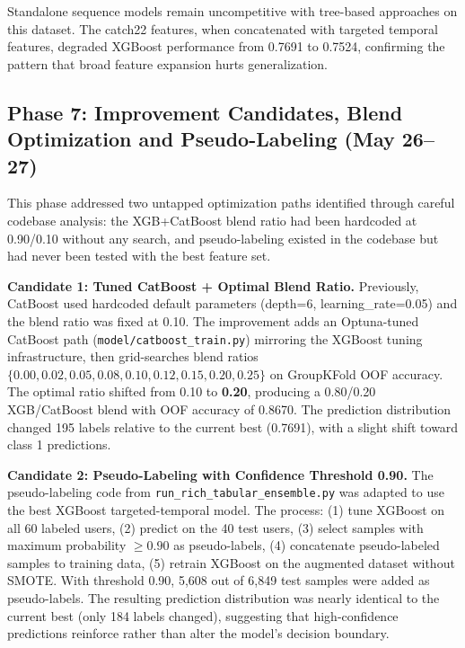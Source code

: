 \documentclass[12pt, a4paper]{article}
\begin{document}
Standalone sequence models remain uncompetitive with tree-based approaches on this dataset. The catch22 features, when concatenated with targeted temporal features, degraded XGBoost performance from 0.7691 to 0.7524, confirming the pattern that broad feature expansion hurts generalization.

\subsection{Phase 7: Improvement Candidates, Blend Optimization and Pseudo-Labeling (May 26--27)}

This phase addressed two untapped optimization paths identified through careful codebase analysis: the XGB+CatBoost blend ratio had been hardcoded at 0.90/0.10 without any search, and pseudo-labeling existed in the codebase but had never been tested with the best feature set.

\textbf{Candidate 1: Tuned CatBoost + Optimal Blend Ratio.} Previously, CatBoost used hardcoded default parameters (depth=6, learning\_rate=0.05) and the blend ratio was fixed at 0.10. The improvement adds an Optuna-tuned CatBoost path (\texttt{model/catboost\_train.py}) mirroring the XGBoost tuning infrastructure, then grid-searches blend ratios $\{0.00, 0.02, 0.05, 0.08, 0.10, 0.12, 0.15, 0.20, 0.25\}$ on GroupKFold OOF accuracy. The optimal ratio shifted from 0.10 to \textbf{0.20}, producing a 0.80/0.20 XGB/CatBoost blend with OOF accuracy of 0.8670. The prediction distribution changed 195 labels relative to the current best (0.7691), with a slight shift toward class 1 predictions.

\textbf{Candidate 2: Pseudo-Labeling with Confidence Threshold 0.90.} The pseudo-labeling code from \texttt{run\_rich\_tabular\_ensemble.py} was adapted to use the best XGBoost targeted-temporal model. The process: (1) tune XGBoost on all 60 labeled users, (2) predict on the 40 test users, (3) select samples with maximum probability $\geq 0.90$ as pseudo-labels, (4) concatenate pseudo-labeled samples to training data, (5) retrain XGBoost on the augmented dataset without SMOTE. With threshold 0.90, 5{,}608 out of 6{,}849 test samples were added as pseudo-labels. The resulting prediction distribution was nearly identical to the current best (only 184 labels changed), suggesting that high-confidence predictions reinforce rather than alter the model's decision boundary.
\end{document}
